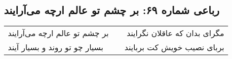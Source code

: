 \begin{center}
\section*{رباعی شماره ۶۹: بر چشم تو عالم ارچه می‌آرایند}
\label{sec:sh069}
\begin{longtable}{l p{0.5cm} r}
بر چشم تو عالم ارچه می‌آرایند
&&
مگرای بدان که عاقلان نگرایند
\\
بسیار چو تو روند و بسیار آیند
&&
بربای نصیب خویش کت بربایند
\\
\end{longtable}
\end{center}
